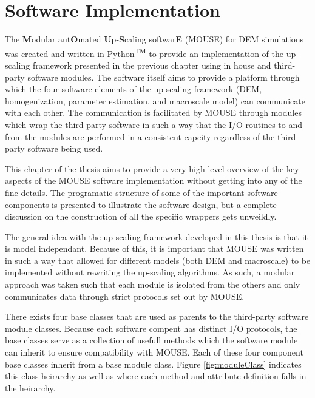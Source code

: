 \chapter{Software Implementation}

The \textbf{M}odular aut\textbf{O}mated \textbf{U}p-\textbf{S}caling softwar\textbf{E} (MOUSE) for DEM simulations was created and written in Python\textsuperscript{TM} to provide an implementation of the up-scaling framework presented in the previous chapter using in house and third-party software modules. The software itself aims to provide a platform through which the four software elements of the up-scaling framework (DEM, homogenization, parameter estimation, and macroscale model) can communicate with each other. The communication is facilitated by MOUSE through modules which wrap the third party software in such a way that the I/O routines to and from the modules are performed in a consistent capcity regardless of the third party software being used. 

This chapter of the thesis aims to provide a very high level overview of the key aspects of the MOUSE software implementation without getting into any of the fine details. The programatic structure of some of the important software components is presented to illustrate the software design, but a complete discussion on the construction of all the specific wrappers gets unweildly.

The general idea with the up-scaling framework developed in this thesis is that it is model independant. Because of this, it is important that MOUSE was written in such a way that allowed for different models (both DEM and macroscale) to be implemented without rewriting the up-scaling algorithms. As such, a modular approach was taken such that each module is isolated from the others and only communicates data through strict protocols set out by MOUSE.

There exists four base classes that are used as parents to the third-party software module classes. Because each software compent has distinct I/O protocols, the base classes serve as a collection of usefull methods which the software module can inherit to ensure compatibility with MOUSE. Each of these four component base classes inherit from a base module class. Figure \ref{fig:moduleClass} indicates this class heirarchy as well as where each method and attribute definition falls in the heirarchy.

